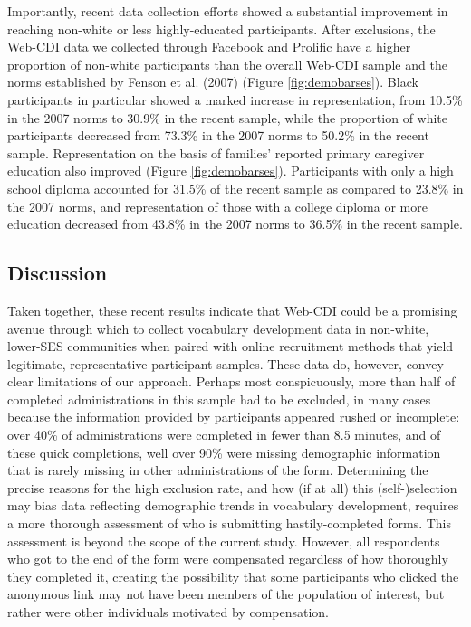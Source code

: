 \documentclass[
  english,
  ,man,floatsintext]{apa6}
\begin{document}
Importantly, recent data collection efforts showed a substantial improvement in reaching non-white or less highly-educated participants. After exclusions, the Web-CDI data we collected through Facebook and Prolific have a higher proportion of non-white participants than the overall Web-CDI sample and the norms established by Fenson et al. (2007) (Figure \ref{fig:demobarses}). Black participants in particular showed a marked increase in representation, from 10.5\% in the 2007 norms to 30.9\% in the recent sample, while the proportion of white participants decreased from 73.3\% in the 2007 norms to 50.2\% in the recent sample. Representation on the basis of families' reported primary caregiver education also improved (Figure \ref{fig:demobarses}). Participants with only a high school diploma accounted for 31.5\% of the recent sample as compared to 23.8\% in the 2007 norms, and representation of those with a college diploma or more education decreased from 43.8\% in the 2007 norms to 36.5\% in the recent sample.

\hypertarget{discussion}{%
\subsection{Discussion}\label{discussion}}

Taken together, these recent results indicate that Web-CDI could be a promising avenue through which to collect vocabulary development data in non-white, lower-SES communities when paired with online recruitment methods that yield legitimate, representative participant samples. These data do, however, convey clear limitations of our approach. Perhaps most conspicuously, more than half of completed administrations in this sample had to be excluded, in many cases because the information provided by participants appeared rushed or incomplete: over 40\% of administrations were completed in fewer than 8.5 minutes, and of these quick completions, well over 90\% were missing demographic information that is rarely missing in other administrations of the form. Determining the precise reasons for the high exclusion rate, and how (if at all) this (self-)selection may bias data reflecting demographic trends in vocabulary development, requires a more thorough assessment of who is submitting hastily-completed forms. This assessment is beyond the scope of the current study. However, all respondents who got to the end of the form were compensated regardless of how thoroughly they completed it, creating the possibility that some participants who clicked the anonymous link may not have been members of the population of interest, but rather were other individuals motivated by compensation.
\end{document}
